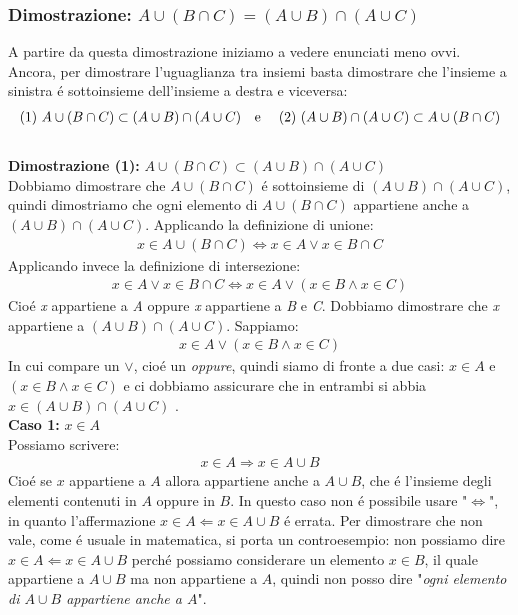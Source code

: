 \documentclass[twoside]{article} %
\begin{document}
	\subsubsection{Dimostrazione: $A\cup (B\cap C)= (A\cup B)\cap (A\cup C)$}
	A partire da questa dimostrazione iniziamo a vedere enunciati meno ovvi.\\
	Ancora, per dimostrare l'uguaglianza tra insiemi basta dimostrare che l'insieme a sinistra \'e sottoinsieme dell'insieme a destra e viceversa: 
	\begin{align*}
		\resizebox{\hsize}{!}{$\text{(1) }A\cup (B\cap C)\subset (A\cup B)\cap (A\cup C) \text{\quad e \quad(2) } (A\cup B)\cap (A\cup C)\subset A\cup (B\cap C)$} 	
	\end{align*}\\
	\textbf{Dimostrazione (1): } $A\cup (B\cap C)\subset (A\cup B)\cap (A\cup C)$\\
	Dobbiamo dimostrare che $A\cup (B\cap C)$ \'e sottoinsieme di $(A\cup B)\cap (A\cup C)$, quindi dimostriamo che ogni elemento di $A\cup (B\cap C)$ appartiene anche a $(A\cup B)\cap (A\cup C)$. Applicando la definizione di unione:
	\begin{gather*}
		x\in A\cup (B\cap C)\Leftrightarrow x\in A\vee x\in B\cap C
	\end{gather*}	
	Applicando invece la definizione di intersezione:
	\begin{gather*}
		x\in A\vee x\in B\cap C\Leftrightarrow x\in A \vee (x\in B \wedge x\in C)
	\end{gather*}	
	Cio\'e \textit{x} appartiene a \textit{A} oppure \textit{x} appartiene a \textit{B} e \textit{C}. Dobbiamo dimostrare che \textit{x} appartiene a $(A\cup B)\cap (A\cup C)$.
	Sappiamo:
	\begin{gather*}
		x\in A \vee (x\in B \wedge x\in C)
	\end{gather*}
	In cui compare un $\vee$, cio\'e un \textit{oppure}, quindi siamo di fronte a due casi: $x\in A$ e $(x\in B \wedge x\in C)$ e ci dobbiamo assicurare che in entrambi si abbia $x\in (A\cup B)\cap (A\cup C)$ \vspace{0.2cm}.\\ 
	\textbf{Caso 1:} $x\in A$\\
	Possiamo scrivere:	
	\begin{gather*}
		x\in A\Rightarrow x\in A\cup B
	\end{gather*} 	
	Cio\'e se $x$ appartiene a $A$ allora appartiene anche a $A\cup B$, che \'e l'insieme degli elementi contenuti in $A$ oppure in $B$. In questo caso non \'e possibile usare "$\Leftrightarrow$", in quanto l'affermazione $x\in A\Leftarrow x\in A\cup B$ \'e errata. Per dimostrare che non vale, come \'e usuale in matematica, si porta un controesempio: non possiamo dire $x\in A\Leftarrow x\in A\cup B$ perch\'e possiamo considerare un elemento $x\in B$, il quale appartiene a $A\cup B$ ma non appartiene a $A$, quindi non posso dire "\textit{ogni elemento di $A\cup B$ appartiene anche a $A$}".\\
\end{document}
